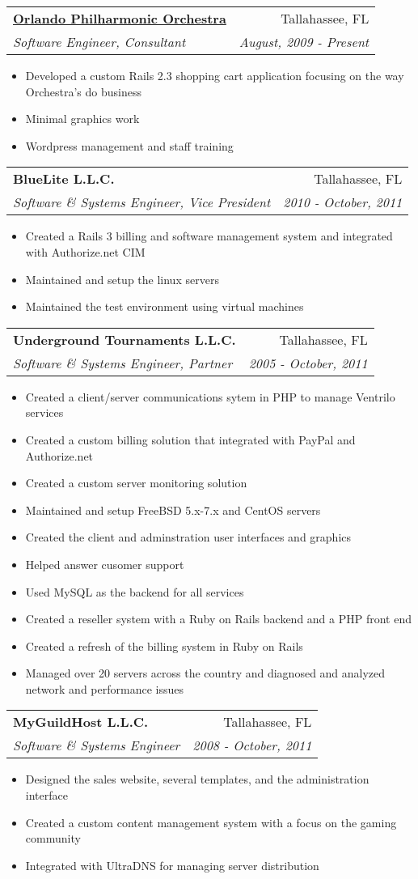 \documentclass[letterpaper,11pt]{article}
\makeatletter
\newcommand{\resitem}[1]{\item #1 \vspace{-2pt}}
\newcommand{\ressubheading}[4]{
\begin{tabular*}{7.0in}{l@{\extracolsep{\fill}}r}
		\textbf{#1} & #2 \\
		\textit{#3} & \textit{#4} \\
\end{tabular*}\vspace{-6pt}}
\makeatother
\begin{document}
\ressubheading{\href{http://orlandophil.org/}{Orlando Philharmonic Orchestra}}{Tallahassee, FL}{Software Engineer, Consultant}{August, 2009 - Present}
\begin{itemize} 
        \resitem{Developed a custom Rails 2.3 shopping cart application focusing on the way Orchestra's do business}
        \resitem{Minimal graphics work}
        \resitem{Wordpress management and staff training}
\end{itemize}

\ressubheading{BlueLite L.L.C.}{Tallahassee, FL}{Software \& Systems Engineer, Vice President}{2010 - October, 2011}
\begin{itemize} 
        \resitem{Created a Rails 3 billing and software management system and integrated with Authorize.net CIM}
        \resitem{Maintained and setup the linux servers}
        \resitem{Maintained the test environment using virtual machines}
\end{itemize}

\ressubheading{Underground Tournaments L.L.C.}{Tallahassee, FL}{Software \& Systems Engineer, Partner}{2005 - October, 2011}
\begin{itemize} 
        \resitem{Created a client/server communications sytem in PHP to manage Ventrilo services} 
        \resitem{Created a custom billing solution that integrated with PayPal and Authorize.net}
        \resitem{Created a custom server monitoring solution}
        \resitem{Maintained and setup FreeBSD 5.x-7.x and CentOS servers}
        \resitem{Created the client and adminstration user interfaces and graphics}
        \resitem{Helped answer cusomer support}
        \resitem{Used MySQL as the backend for all services}
        \resitem{Created a reseller system with a Ruby on Rails backend and a PHP front end}
        \resitem{Created a refresh of the billing system in Ruby on Rails}
        \resitem{Managed over 20 servers across the country and diagnosed and analyzed network and performance issues}
\end{itemize}

\ressubheading{MyGuildHost L.L.C.}{Tallahassee, FL}{Software \& Systems Engineer}{2008 - October, 2011}
\begin{itemize} 
        \resitem{Designed the sales website, several templates, and the administration interface}
        \resitem{Created a custom content management system with a focus on the gaming community}
        \resitem{Integrated with UltraDNS for managing server distribution}
\end{itemize}
\end{document}
